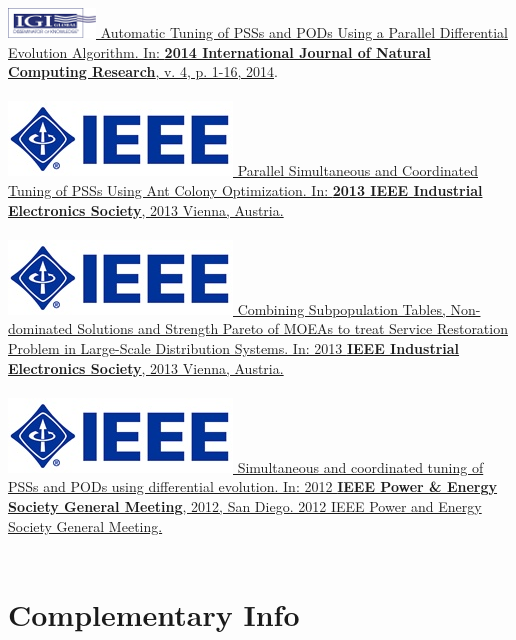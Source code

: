 \documentclass[]{friggeri-cv}
\begin{document}
\href{http://dx.doi.org/10.4018/ijncr.2014010101}{\includegraphics[height=\fontcharht\font`\B]{img/igi_global_.png} Automatic Tuning of PSSs and PODs Using a Parallel Differential Evolution Algorithm. In: \textbf{2014 International Journal of Natural Computing Research}, v. 4, p. 1-16, 2014}.\\
\\
\href{http://dx.doi.org/10.1109/IECON.2013.6699462}{\includegraphics[scale=0.11]{img/ieee.jpg} Parallel Simultaneous and Coordinated Tuning of PSSs Using Ant Colony Optimization. In: \textbf{2013 IEEE Industrial Electronics Society}, 2013 Vienna, Austria.}\\
\\
\href{http://dx.doi.org/10.1109/IECON.2013.6699436}{\includegraphics[scale=0.11]{img/ieee.jpg} Combining Subpopulation Tables, Non-dominated Solutions and Strength Pareto of MOEAs to treat Service Restoration Problem in Large-Scale Distribution Systems. In: 2013 \textbf{IEEE Industrial Electronics Society}, 2013 Vienna, Austria.}\\
\\
\href{http://dx.doi.org/10.1109/PESGM.2012.6345340}{\includegraphics[scale=0.11]{img/ieee.jpg} Simultaneous and coordinated tuning of PSSs and PODs using differential evolution. In: 2012 \textbf{IEEE Power \& Energy Society General Meeting}, 2012, San Diego. 2012 IEEE Power and Energy Society General Meeting.}\\
\\
\section{Complementary Info}
\end{document}
